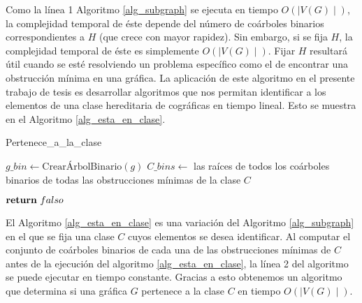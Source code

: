 Como la línea 1 Algoritmo \ref{alg_subgraph} se ejecuta en tiempo $O(\mid V(G)
\mid)$, la complejidad temporal de éste depende del número de coárboles binarios
correspondientes a $H$ (que crece con mayor rapidez). Sin embargo, si se fija
$H$, la complejidad temporal de éste es simplemente  $O(\mid V(G) \mid)$. Fijar
$H$ resultará útil cuando se esté resolviendo un problema específico como el de
encontrar una obstrucción mínima en una gráfica. La aplicación de este algoritmo
en el presente trabajo de tesis es desarrollar algoritmos que nos permitan
identificar a los elementos de una clase hereditaria de cográficas en tiempo
lineal. Esto se muestra en el Algoritmo \ref{alg_esta_en_clase}. 

\begin{algorithm}[ht!]
\caption{Pertenece_a_la_clase}
\label{alg_esta_en_clase}
\DontPrintSemicolon %

$g\_bin \gets \text{CrearÁrbolBinario}(g)$\;
$C\_bins \gets$ las raíces de todos los coárboles binarios de todas las obstrucciones mínimas de la clase $C$\;


$\Return\ falso$\;

\end{algorithm}

El Algoritmo \ref{alg_esta_en_clase} es una variación del Algoritmo
\ref{alg_subgraph} en el que se fija una clase $C$ cuyos elementos se desea
identificar. Al computar el conjunto de coárboles binarios de cada una de las
obstrucciones mínimas de $C$ antes de la ejecución del algoritmo
\ref{alg_esta_en_clase}, la línea 2 del algoritmo se puede ejecutar en tiempo
constante. Gracias a esto obtenemos un algoritmo que determina si una gráfica
$G$ pertenece a la clase $C$ en tiempo $O(\mid V(G) \mid)$.
